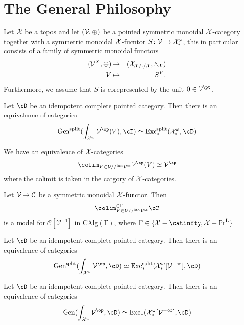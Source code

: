 \section{The General Philosophy}

Let $\cal X$ be a topos and let $(\cal V, \oplus)$ be a pointed symmetric monoidal $\cal X$-category together with a 
symmetric monoidal $\cal X$-fucntor $S \colon \cal V \to \cal X^\omega_*$, this in particular consists 
of a family of symmetric monoidal functors 
\begin{eqnarray*}
({\cal V}^X,\oplus) &\to& (\cal X_{X/\cdot /X}, \wedge_X)    \\
V & \mapsto & S^V.
\end{eqnarray*}
Furthermore, we assume that $S$ is corepresented by the 
unit $0 \in \cal V^\pt$.

\begin{proposition}
Let $\cD$ be an idempotent complete pointed category. Then there is 
an equivalence of categories 
\[
  \mathrm{Gen}^\mathrm{split}(\int_{\cal X^\omega} {\cal V}^{\op}(V), \cD) \simeq \mathrm{Exc}_*^\mathrm{split}(\cal X_*^\omega, \cD)  
\]
\end{proposition}

\begin{proposition} We have an equivalence of $\cal X$-categories 
    \[
        \colim_{V \in \cal V //^\mathrm{lax} \cal V^\simeq} {\cal V}^{\op}(V) \simeq \cal V^\op   
    \]
    where the colimit is taken in the catgory of $\cal X$-categories.
\end{proposition}

\begin{proposition} Let $\cal V \to \cal C$ be a symmetric monoidal $\cal X$-functor.
    Then 
    \[
    \colim^{\in \Gamma}_{V \in \cal V //^\mathrm{lax} \cal V^\simeq} \cC   
    \]
    is a model for $\mathcal{C}[\mathcal{V}^{- 1}]$ in $\mathrm{CAlg(\Gamma)}$, where 
    $\Gamma \in \{\cal X -\catinfty, \cal{X} - \mathrm{Pr}^\mathrm{L} \}$
\end{proposition}

\begin{corollary}
Let $\cD$ be an idempotent complete pointed category. Then there is an 
equivalence of categories 
\[
    \mathrm{Gen}^\mathrm{split}(\int_{\cal X ^\omega} \cal V ^\op, \cD) \simeq \mathrm{Exc}^\mathrm{split}_*(\mathcal{X}^\omega_*[\mathcal{V}^{- 1}], \cD)
\]
\end{corollary}
\begin{corollary}
    Let $\cD$ be an idempotent complete pointed category. Then there is an 
    equivalence of categories 
    \[
        \mathrm{Gen}(\int_{\cal X ^\omega} \cal V ^\op, \cD) \simeq \mathrm{Exc}_*(\mathcal{X}^\omega_*[\mathcal{V}^{- 1}], \cD)
    \]
    \end{corollary}

